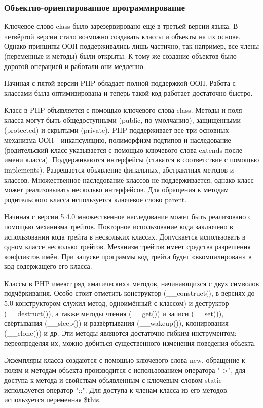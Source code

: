 \subsubsection{Объектно-ориентированное программирование }
\label{sub:practice:oop_php}
Ключевое слово class было зарезервировано ещё в третьей версии языка. В четвёртой версии стало возможно создавать классы и объекты на их основе. Однако принципы ООП поддерживались лишь частично, так например, все члены (переменные и методы) были открыты. К тому же создание объектов было дорогой операцией и работали они медленно.

Начиная с пятой версии PHP обладает полной поддержкой ООП. Работа с классами была оптимизирована и теперь такой код работает достаточно быстро.

Класс в PHP объявляется с помощью ключевого слова class. Методы и поля класса могут быть общедоступными (public, по умолчанию), защищёнными (protected) и скрытыми (private). PHP поддерживает все три основных механизма ООП - инкапсуляцию, полиморфизм подтипов и наследование (родительский класс указывается с помощью ключевого слова extends после имени класса). Поддерживаются интерфейсы (ставятся в соответствие с помощью implements). Разрешается объявление финальных, абстрактных методов и классов. Множественное наследование классов не поддерживается, однако класс может реализовывать несколько интерфейсов. Для обращения к методам родительского класса используется ключевое слово parent.

Начиная с версии 5.4.0 множественное наследование может быть реализовано с помощью механизма трейтов. Повторное использование кода заключено в использовании кода трейта в нескольких классах. Допускается использовать в одном классе несколько трейтов. Механизм трейтов имеет средства разрешения конфликтов имён. При запуске программы код трейта будет «вкомпилирован» в код содержащего его класса.

Классы в PHP имеют ряд «магических» методов, начинающихся с двух символов подчёркивания. Особо стоит отметить конструктор (\_\_construct(), в версиях до 5.0 конструктором служил метод, одноимённый с классом) и деструктор (\_\_destruct()), а также методы чтения (\_\_get()) и записи (\_\_set()), свёртывания (\_\_sleep()) и развёртывания (\_\_wakeup()), клонирования (\_\_clone()) и др. Эти методы являются достаточно гибким инструментом: переопределяя их, можно добиться существенного изменения поведения объекта.

Экземпляры класса создаются с помощью ключевого слова new, обращение к полям и методам объекта производится с использованием оператора "->", для доступа к метода и свойствам объявленным с ключевым словом static используется оператор "::". Для доступа к членам класса из его методов используется переменная \$this.

